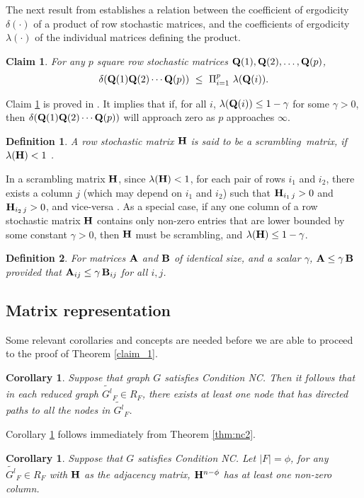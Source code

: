 \documentclass[letterpaper, 11pt]{article}
\newtheorem{definition}{Definition}[section]
\newtheorem{corollary}[theorem]{Corollary}
\newtheorem{claim}[theorem]{Claim}
\begin{document}
The next result from \cite{Hajnal58} establishes a relation between the coefficient of ergodicity $\delta(\cdot)$ of a product of row stochastic matrices, and the coefficients of ergodicity $\lambda(\cdot)$ of the individual matrices defining the product.

\begin{claim}
\label{claim_delta}
For any $p$ square row stochastic matrices ${\bf{Q}}(1),{\bf{Q}}(2),\dots ,{\bf{Q}}(p)$,
\begin{align}
\delta({\bf{Q}}(1){\bf{Q}}(2)\cdots {\bf{Q}}(p)) ~\leq ~
 \Pi_{i=1}^p ~ \lambda({\bf{Q}}(i)).
\end{align}
\end{claim}
Claim \ref{claim_delta} is proved in \cite{Hajnal58}. It implies that
if, for all $i$, $\lambda({\bf{Q}}(i))\leq 1-\gamma$ for some $\gamma>0$, then $\delta({\bf{Q}}(1){\bf{Q}}(2)\cdots {\bf{Q}}(p))$ will approach zero as $p$ approaches $\infty$.


\begin{definition}
A row stochastic
 matrix ${\bf{H}}$ is said to be a {\em scrambling}\, matrix, if $\lambda({\bf{H}})<1$
{\normalfont \cite{Hajnal58,Wolfowitz}}.
\end{definition}

In a scrambling matrix ${\bf{H}}$, since $\lambda({\bf{H}})<1$, for each pair of
rows $i_1$ and $i_2$, there exists a column $j$ (which may depend on
$i_1$ and $i_2$) such that
 ${\bf{H}}_{i_1\,j}>0$ and ${\bf{H}}_{i_2\,j}>0$, and vice-versa \cite{Hajnal58,Wolfowitz}.
As a special case, if any one column of a row stochastic matrix ${\bf{H}}$
contains only non-zero entries that are lower bounded by some
constant $\gamma>0$, then ${\bf{H}}$ must be scrambling, and $\lambda({\bf{H}})\leq 1-\gamma$.

\begin{definition}
For matrices ${\bf{A}}$ and ${\bf{B}}$ of identical size, and
a scalar $\gamma$, ${\bf{A}}\leq \gamma \, {\bf{B}}$ provided
that ${\bf{A}}_{ij}\leq \gamma\, {\bf{B}}_{ij}$ for all $i,j$.
\end{definition}

\subsection{Matrix representation}\label{app:claim_1}
Some relevant corollaries and concepts are needed before we are able to proceed to the proof of Theorem \ref{claim_1}.  

\begin{corollary}
\label{claim_suff}
Suppose that graph $G$ satisfies Condition NC. Then it follows that in each reduced graph $\widetilde{G^l}_F \in R_F$,
there exists at least one node that has directed paths to all the nodes in $\widetilde{G^l}_F$.
\end{corollary}
Corollary \ref{claim_suff} follows immediately from Theorem \ref{thm:nc2}.
\begin{corollary}
\label{l_one_column}
Suppose that $G$ satisfies Condition NC. Let $|F|=\phi$, for any $\widetilde{G^l}_F\in R_F$ with ${\bf{H}}$ as the adjacency matrix, ${\bf{H}}^{n-\phi}$ has at least one non-zero column.
\end{corollary}
\end{document}
